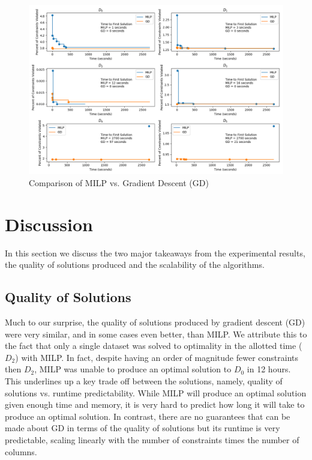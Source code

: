 \documentclass[a4paper]{article}
\begin{document}
\begin{figure}[ht!]
	\caption{Comparison of MILP vs. Gradient Descent (GD)}
	\includegraphics[width=\textwidth]{./time_series.png}
\end{figure}

\section{Discussion}

In this section we discuss the two major takeaways from the experimental results,
the quality of solutions produced and the scalability of the algorithms.

\subsection{Quality of Solutions}

Much to our surprise, the quality of solutions produced by gradient descent
(GD) were very similar, and in some cases even better, than MILP. We attribute this
to the fact that only a single dataset was solved to optimality in the 
allotted time ($D_2$) with MILP.  In fact, despite having an order of magnitude 
fewer constraints then $D_2$, MILP was unable to produce an optimal solution to $D_0$ 
in 12 hours.  This underlines up a key trade off
between the solutions, namely, quality of solutions vs. runtime predictability.
While MILP will produce an optimal solution given enough time and memory, it is
very hard to predict how long it will take to produce an optimal solution. 
In contrast, there are no guarantees that can be made about GD in terms of
the quality of solutions but its runtime is very predictable, scaling
linearly with the number of constraints times the number of columns. 
\end{document}
